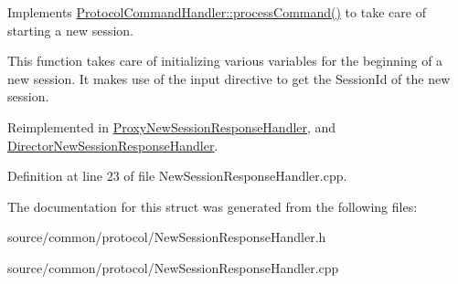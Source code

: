 Implements \hyperlink{struct_picto_1_1_protocol_command_handler_aeeaa16fe40f10fd55996d74e16e29cad}{Protocol\-Command\-Handler\-::process\-Command()} to take care of starting a new session. 

This function takes care of initializing various variables for the beginning of a new session. It makes use of the input directive to get the Session\-Id of the new session. 

Reimplemented in \hyperlink{struct_proxy_new_session_response_handler_a122cda53c346211dc8ad503dea11727d}{Proxy\-New\-Session\-Response\-Handler}, and \hyperlink{struct_director_new_session_response_handler_a8cbf7d69389728fbefca4003b822e534}{Director\-New\-Session\-Response\-Handler}.



Definition at line 23 of file New\-Session\-Response\-Handler.\-cpp.



The documentation for this struct was generated from the following files\-:\begin{DoxyCompactItemize}
\item 
source/common/protocol/New\-Session\-Response\-Handler.\-h\item 
source/common/protocol/New\-Session\-Response\-Handler.\-cpp\end{DoxyCompactItemize}
